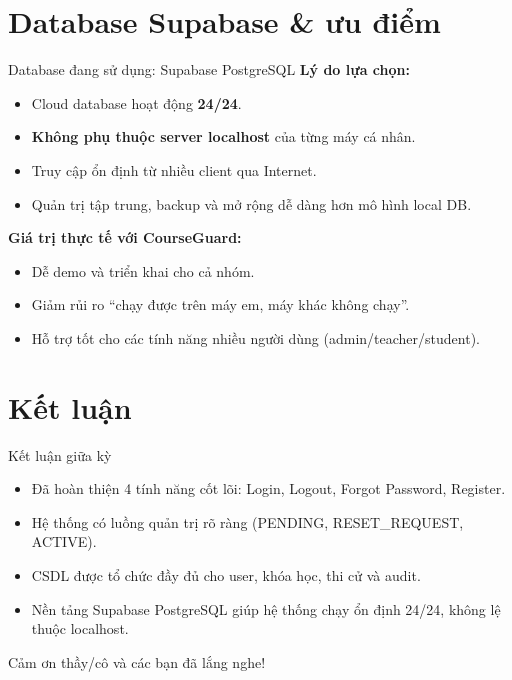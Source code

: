 \documentclass[aspectratio=169]{beamer}
\begin{document}
\section{Database Supabase \& ưu điểm}

\begin{frame}{Database đang sử dụng: Supabase PostgreSQL}
\textbf{Lý do lựa chọn:}
\begin{itemize}
  \item Cloud database hoạt động \textbf{24/24}.
  \item \textbf{Không phụ thuộc server localhost} của từng máy cá nhân.
  \item Truy cập ổn định từ nhiều client qua Internet.
  \item Quản trị tập trung, backup và mở rộng dễ dàng hơn mô hình local DB.
\end{itemize}

\vspace{0.5em}
\textbf{Giá trị thực tế với CourseGuard:}
\begin{itemize}
  \item Dễ demo và triển khai cho cả nhóm.
  \item Giảm rủi ro “chạy được trên máy em, máy khác không chạy”.
  \item Hỗ trợ tốt cho các tính năng nhiều người dùng (admin/teacher/student).
\end{itemize}
\end{frame}

\section{Kết luận}

\begin{frame}{Kết luận giữa kỳ}
\begin{itemize}
  \item Đã hoàn thiện 4 tính năng cốt lõi: Login, Logout, Forgot Password, Register.
  \item Hệ thống có luồng quản trị rõ ràng (PENDING, RESET\_REQUEST, ACTIVE).
  \item CSDL được tổ chức đầy đủ cho user, khóa học, thi cử và audit.
  \item Nền tảng Supabase PostgreSQL giúp hệ thống chạy ổn định 24/24, không lệ thuộc localhost.
\end{itemize}

\vspace{0.8em}
\centering
\Large Cảm ơn thầy/cô và các bạn đã lắng nghe!
\end{frame}
\end{document}
